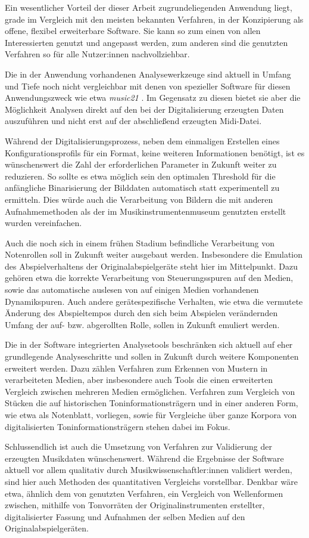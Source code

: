 Ein wesentlicher Vorteil der dieser Arbeit zugrundeliegenden Anwendung liegt, grade im Vergleich mit den meisten bekannten Verfahren, in der Konzipierung als offene, flexibel erweiterbare Software.
Sie kann so zum einen von allen Interessierten genutzt und angepasst werden, zum anderen sind die genutzten Verfahren so für alle Nutzer:innen nachvollziehbar.

Die in der Anwendung vorhandenen Analysewerkzeuge sind aktuell in Umfang und Tiefe noch nicht vergleichbar mit denen von spezieller Software für diesen Anwendungszweck wie etwa \textit{music21} \parencite[]{music21}.
Im Gegensatz zu diesen bietet sie aber die Möglichkeit Analysen direkt auf den bei der Digitalisierung erzeugten Daten auszuführen und nicht erst auf der abschließend erzeugten Midi-Datei.

Während der Digitalisierungsprozess, neben dem einmaligen Erstellen eines Konfigurationsprofils für ein Format, keine weiteren Informationen benötigt, ist es wünschenswert die Zahl der erforderlichen Parameter in Zukunft weiter zu reduzieren.
So sollte es etwa möglich sein den optimalen Threshold für die anfängliche Binarisierung der Bilddaten automatisch statt experimentell zu ermitteln.
Dies würde auch die Verarbeitung von Bildern die mit anderen Aufnahmemethoden als der im Musikinstrumentenmuseum genutzten erstellt wurden vereinfachen.

Auch die noch sich in einem frühen Stadium befindliche Verarbeitung von Notenrollen soll in Zukunft weiter ausgebaut werden.
Insbesondere die Emulation des Abspielverhaltens der Originalabspielgeräte steht hier im Mittelpunkt.
Dazu gehören etwa die korrekte Verarbeitung von Steuerungsspuren auf den Medien, sowie das automatische auslesen von auf einigen Medien vorhandenen Dynamikspuren.
Auch andere gerätespezifische Verhalten, wie etwa die vermutete Änderung des Abspieltempos durch den sich beim Abspielen verändernden Umfang der auf- bzw. abgerollten Rolle, sollen in Zukunft emuliert werden.

Die in der Software integrierten Analysetools beschränken sich aktuell auf eher grundlegende Analyseschritte und sollen in Zukunft durch weitere Komponenten erweitert werden.
Dazu zählen Verfahren zum Erkennen von Mustern in verarbeiteten Medien, aber insbesondere auch Tools die einen erweiterten Vergleich zwischen mehreren Medien ermöglichen.
Verfahren zum Vergleich von Stücken die auf historischen Toninformationsträgern und in einer anderen Form, wie etwa als Notenblatt, vorliegen, sowie für Vergleiche über ganze Korpora von digitalisierten Toninformationsträgern stehen dabei im Fokus. 

Schlussendlich ist auch die Umsetzung von Verfahren zur Validierung der erzeugten Musikdaten wünschenswert.
Während die Ergebnisse der Software aktuell vor allem qualitativ durch Musikwissenschaftler:innen validiert werden, sind hier auch Methoden des quantitativen Vergleichs vorstellbar.
Denkbar wäre etwa, ähnlich dem von \textcite[]{colmenares_2011} genutzten Verfahren, ein Vergleich von Wellenformen zwischen, mithilfe von Tonvorräten der Originalinstrumenten erstellter, digitalisierter Fassung und Aufnahmen der selben Medien auf den Originalabspielgeräten.
